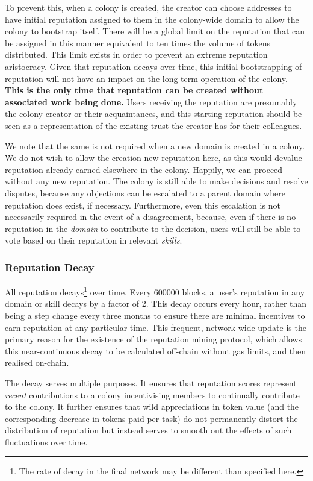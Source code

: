 To prevent this, when a colony is created, the creator can choose addresses to have initial reputation assigned to them in the colony-wide domain to allow the colony to bootstrap itself. There will be a global limit on the reputation that can be assigned in this manner equivalent to ten times the volume of tokens distributed. This limit exists in order to prevent an extreme reputation aristocracy. Given that reputation decays over time, this initial bootstrapping of reputation will not have an impact on the long-term operation of the colony. \textbf{This is the only time that reputation can be created without associated work being done.} Users receiving the reputation are presumably the colony creator or their acquaintances, and this starting reputation should be seen as a representation of the existing trust the creator has for their colleagues. 

We note that the same is not required when a new domain is created in a colony. We do not wish to allow the creation new reputation here, as this would devalue reputation already earned elsewhere in the colony. Happily, we can proceed without any new reputation. The colony is still able to make decisions and resolve disputes, because any objections can be escalated to a parent domain where reputation does exist, if necessary. Furthermore, even this escalation is not necessarily required in the event of a disagreement, because, even if there is no reputation in the \emph{domain} to contribute to the decision, users will still be able to vote based on their reputation in relevant \emph{skills}.

\subsubsection{Reputation Decay}
All reputation decays\footnote{The rate of decay in the final network may be different than specified here.} over time. Every 600000 blocks, a user's reputation in any domain or skill decays by a factor of 2. This decay occurs every hour, rather than being a step change every three months to ensure there are minimal incentives to earn reputation at any particular time. This frequent, network-wide update is the primary reason for the existence of the reputation mining protocol, which allows this near-continuous decay to be calculated off-chain without gas limits, and then realised on-chain. 

The decay serves multiple purposes. It ensures that reputation scores represent \emph{recent} contributions to a colony incentivising members to continually contribute to the colony. It further ensures that wild appreciations in token value (and the corresponding decrease in tokens paid per task) do not permanently distort the distribution of reputation but instead serves to smooth out the effects of such fluctuations over time.

